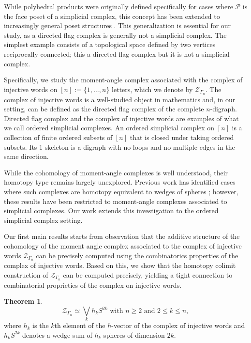 \documentclass[a4paper,11pt]{article}
\theoremstyle{definition}
\newtheorem{alphabeticaltheorem}{Theorem}[theorem] %
\newcommand{\PP}{\mathcal{P}}
\newcommand{\ZZ}{\mathcal{Z}}
\begin{document}
While polyhedral products were originally defined specifically for cases where $\PP$ is the face poset of a simplicial complex, this concept has been extended to increasingly general poset structures \cite{lue-panov,kishimoto2019polyhedral}. This generalization is essential for our study, as a directed flag complex is generally not a simplicial complex. The simplest example consists of a topological space defined by two vertices reciprocally connected; this a directed flag complex but it is not a simplicial complex. 

Specifically, we study the moment-angle complex associated with the complex of injective words on $[n]:=\{1,…,n\}$ letters, which we denote by $\ZZ_{\Gamma_n}$. The complex of injective words is a well-studied object in mathematics \cite{farmer1978cellular,lex-wachs-bjoern,injective-words-ran-meshulam-wojtek,injective-words-stability} and, in our setting, can be defined as the directed flag complex of the complete $n$-digraph. Directed flag complex and the complex of injective words are examples of what we call ordered simplicial complexes. An ordered simplicial complex on $[n]$ is a collection of finite ordered subsets of $[n]$ that is closed under taking ordered subsets. Its 1-skeleton is a digraph with no loops and no multiple edges in the same direction.

While the cohomology of moment-angle complexes is well understood, their homotopy type remains largely unexplored. Previous work has identified cases where such complexes are homotopy equivalent to wedges of spheres \cite{shifted-GRBIC20136,GRBIC2007357_coordinatespace,shifted-IRIYE2013716}; however, these results have been restricted to moment-angle complexes associated to simplicial complexes. Our work extends this investigation to the ordered simplicial complex setting. 

Our first main results starts from observation that the additive structure of the cohomology of the moment angle complex associated to the complex of injective words $\ZZ_{\Gamma_n}$ can be precisely computed using the combinatorics properties of the complex of injective words. Based on this, we show that the homotopy colimit construction of $\ZZ_{\Gamma_n}$ can be computed precisely, yielding a tight connection to combinatorial proprieties of the complex on injective words.

\begin{alphabeticaltheorem}\label{theomA}
\[
\ZZ_{\Gamma_n} \simeq \bigvee_k h_k S^{2k} \text{ with } n\geq 2 \text{ and }  2 \leq k \leq n,
\]
where $h_k$ is the $k$th element of the $h$-vector of the complex of injective words and $h_k S^{2k}$ denotes a wedge sum of $h_k$ spheres of dimension $2k$.
\end{alphabeticaltheorem}
\end{document}
